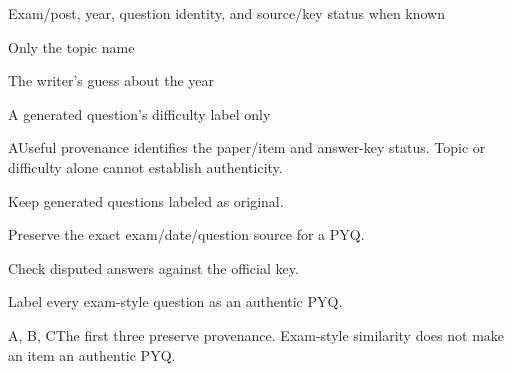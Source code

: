 \begin{enumerate}[label=\textbf{Q\arabic*.}, leftmargin=*]
  {\item Exam/post, year, question identity, and source/key status when known
   \item Only the topic name
   \item The writer's guess about the year
   \item A generated question's difficulty label only}
  {A}{Useful provenance identifies the paper/item and answer-key status. Topic or difficulty alone cannot establish authenticity.}
  {\item Keep generated questions labeled as original.
   \item Preserve the exact exam/date/question source for a PYQ.
   \item Check disputed answers against the official key.
   \item Label every exam-style question as an authentic PYQ.}
  {A, B, C}{The first three preserve provenance. Exam-style similarity does not make an item an authentic PYQ.}
\fi
\end{enumerate}
